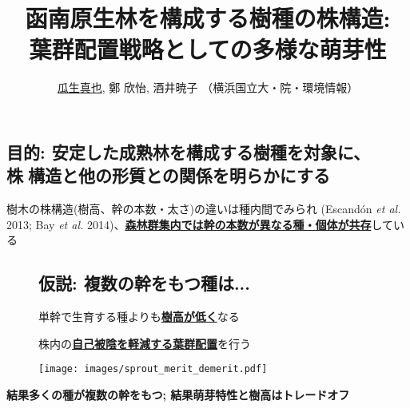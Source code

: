 \documentclass[a0, 30pt, plainboxedsections]{sciposter} %
\title{\textcolor{Blue1}{函南原生林を構成する樹種の株構造:\\\vspace{-0.2em} 葉群配置戦略としての多様な萌芽性}}
\author{\underline{瓜生真也}, 鄭 欣怡, 酒井暁子 （横浜国立大・院・環境情報） \normalsize{\faEnvelope \hspace{0.02em} \fontspec{HelveticaNeue-Italic}{suika1127@gmail.com}}}
\begin{document}
\maketitle
\vspace{-2em}
\begin{multicols}{2}
\begin{mdframed}[style=section.frame]
  \centering\LARGE\textbf{\color{white}{はじめに}}
\end{mdframed}

\vspace{-0.6em}\subsection*{目的: 安定した成熟林を構成する樹種を対象に、\\\hspace*{10em}株構造と他の形質との関係を明らかにする}

樹木の株構造(樹高、幹の本数・太さ)の違いは種内間でみられ {\footnotesize(Escandón \textit{et al.} 2013; Bay \textit{et al.} 2014)}、\textbf{\underline{森林群集内では幹の本数が異なる種・個体が共存}}している

\vspace{-0.6em}\begin{figure}
 \begin{minipage}{0.6\hsize}
 \subsection*{仮説: 複数の幹をもつ種は...}
   単幹で生育する種よりも\underline{\textbf{樹高が低く}}なる
  
   株内の\underline{\textbf{自己被陰を軽減する葉群配置}}を行う
 \end{minipage}
 \begin{minipage}{0.4\hsize}
  \centering
   \texttt{[image: images/sprout\_merit\_demerit.pdf]}  
 \end{minipage}
\end{figure}

\columnbreak
\begin{mdframed}[style=conclusion.frame,frametitle={\textbf{\Large{\faFlagAlt \vspace{0.02em} 結論: {萌芽性は樹高と背反的に進化しており、\\\hspace*{2.8em}群集の中に多様な萌芽性をもつ種が存在する}}}}]
  \vspace{0.4em}
  \flushleft
  \normalsize{
  \textbf{結果多くの種が複数の幹をもつ; 結果萌芽特性と樹高はトレードオフ}
  
}
\end{mdframed}
\end{multicols}
\end{document}
